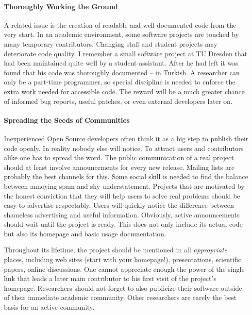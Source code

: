 \paragraph*{Thoroughly Working the Ground}
A related issue is the creation of readable and well documented code from the
very start. In an academic environment, some software projects are touched by
many temporary contributors. Changing staff and student projects may deteriorate
code quality. I remember a small software project at TU Dresden that had been
maintained quite well by a student assistant. After he had left it was found
that his code was thoroughly documented -- in Turkish. A researcher can only be
a part-time programmer, so special discipline is needed to enforce the extra
work needed for accessible code. The reward will be a much greater chance of
informed bug reports, useful patches, or even external developers later on.

\paragraph*{Spreading the Seeds of Communities}
Inexperienced Open Source developers often think it as a big step to publish
their code openly. In reality nobody else will notice. To attract users and
contributors alike one has to spread the word. The public communication of a
real project should at least involve announcements for every new release.
Mailing lists are probably the best channels for this. Some social skill is
needed to find the balance between annoying spam and shy understatement.
Projects that are motivated by the honest conviction that they will help users
to solve real problems should be easy to advertise respectably. Users will
quickly notice the difference between shameless advertising and useful
information. Obviously, active announcements should wait until the project is
ready. This does not only include its actual code but also its homepage and
basic usage documentation.

Throughout its lifetime, the project should be mentioned in all
\emph{appropriate} places, including web sites (start with your homepage!),
presentations, scientific papers, online discussions. One cannot appreciate
enough the power of the single link that leads a later main contributor to his
first visit of the project's homepage. Researchers should not forget to also
publicize their software outside of their immediate academic community. Other
researchers are rarely the best basis for an active community.

